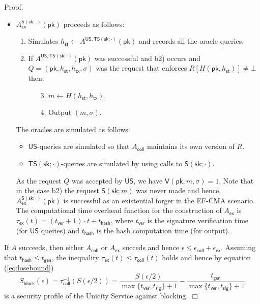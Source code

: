 \documentclass{article}
\newenvironment{proof}{\textsf{Proof}.}{\hfill$\Box$}
\newcommand{\sigver}[0]{\mathsf{V}}
\newcommand{\pubkey}[0]{\mathsf{pk}}
\newcommand{\prikey}[0]{\mathsf{sk}}
\newcommand{\unisrv}[0]{\mathsf{US}}
\begin{document}
\begin{proof}
\begin{itemize}
\item $A_\mathsf{ex}^{\mathsf{S(\prikey;\cdot)}}(\pubkey)$ proceeds as follows:
 \begin{enumerate}
  \item Simulates $h_\mathsf{st}\gets A^{\mathsf{US},\mathsf{TS}(\prikey;\cdot)}(\pubkey)$ and records all the oracle queries.
  \item If $A^{\mathsf{US},\mathsf{TS}(\prikey;\cdot)}(\pubkey)$ was successful and b2) occurs and $Q=(\pubkey, h_\mathsf{st}, h_\mathsf{tx}, \sigma)$ was the request that enforces $R[H(\pubkey, h_\mathsf{st})]\neq\bot$ then:
  \begin{enumerate}
    \item[3.] $m\gets H(h_\mathsf{st}, h_\mathsf{tx})$.
    \item[4.] Output $(m,\sigma)$.
  \end{enumerate}
 \end{enumerate}
The oracles are simulated as follows:
 \begin{itemize}
  \item $\mathsf{US}$-queries are simulated so that $A_\mathsf{coll}$ maintains its own version of $R$.
  \item $\mathsf{TS}(\prikey;\cdot)$-queries are simulated by using calls to $\mathsf{S}(\prikey;\cdot)$.
 \end{itemize}
 As the request $Q$ was accepted by $\unisrv$, we have $\sigver(\pubkey,m,\sigma)=1$. Note that in the case b2) the request $\mathsf{S}(\prikey; m)$ was never made and hence, $A_\mathsf{ex}^{\mathsf{S(\prikey;\cdot)}}(\pubkey)$ is successful as an existential forger in the EF-CMA scenario. The computational time overhead function for the construction of $A_\mathsf{ex}$ is $\tau_\mathsf{ex}(t) = (t_\mathsf{ver}+1)\cdot t + t_\mathsf{hash}$, where
$t_\mathsf{ver}$ is the signature verification time (for $\unisrv$ queries) and
$t_\mathsf{hash}$ is the hash computation time (for output).
\end{itemize}
If $A$ succeeds, then either $A_\mathsf{coll}$ or $A_\mathsf{ex}$ succeds and hence $\epsilon \le \epsilon_\mathsf{coll} + \epsilon_\mathsf{ex}$.
Assuming that $t_\mathsf{hash}\le t_\mathsf{gen}$, the inequality
$\tau_\mathsf{ex}(t)\le \tau_\mathsf{coll}(t)$ holds and hence by equation (\ref{eq:losebound})
\[
S_\mathsf{block}(\epsilon) = \tau^{-1}_\mathsf{coll}(S(\epsilon/2)) =
\frac{S(\epsilon/2)}{\max\{t_\mathsf{ver}, t_\mathsf{sig}\}+1} - \frac{t_\mathsf{gen}}{\max\{t_\mathsf{ver}, t_\mathsf{sig}\}+1}
\]
is a security profile of the Unicity Service against blocking.
\end{proof}
\end{document}
